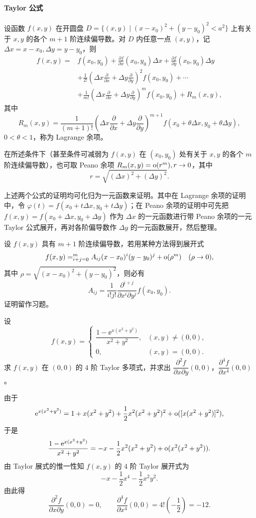 \paragraph{Taylor 公式}
设函数 $f(x,y)$ 在开圆盘 $D=\{(x,y)\mid (x-x_0)^2+(y-y_0)^2<a^2\}$ 上有关于 $x,y$ 的各个 $m+1$ 阶连续偏导数。对 $D$ 内任意一点 $(x,y)$，记 $\Delta x=x-x_0,\Delta y=y-y_0$，则
\[
\begin{aligned}
  f(x,y)={}&f(x_0,y_0)+\frac{\partial f}{\partial x}(x_0,y_0)\Delta x
  +\frac{\partial f}{\partial y}(x_0,y_0)\Delta y\\
  &+\frac1{2!}\left(\Delta x\frac{\partial}{\partial x}+\Delta y\frac{\partial}{\partial y}\right)^2 f(x_0,y_0)+\cdots\\
  &+\frac1{m!}\left(\Delta x\frac{\partial}{\partial x}+\Delta y\frac{\partial}{\partial y}\right)^m f(x_0,y_0)+R_m(x,y),
\end{aligned}
\]
其中
\[
  R_m(x,y)=\frac1{(m+1)!}
  \left(\Delta x\frac{\partial}{\partial x}+\Delta y\frac{\partial}{\partial y}\right)^{m+1}
  f(x_0+\theta\Delta x,y_0+\theta\Delta y),
\]
$0<\theta<1$，称为 Lagrange 余项。

在所述条件下（甚至条件可减弱为 $f(x,y)$ 在 $(x_0,y_0)$ 处有关于 $x,y$ 的各个 $m$ 阶连续偏导数），也可取 Peano 余项 $R_m(x,y)=\mathrm{o}(r^m),r\to0$，其中
\[
  r=\sqrt{(\Delta x)^2+(\Delta y)^2}.
\]

上述两个公式的证明均可化归为一元函数来证明。其中在 Lagrange 余项的证明中，令 $\varphi(t)=f(x_0+t\Delta x,y_0+t\Delta y)$；在 Peano 余项的证明中可先把 $f(x,y)=f(x_0+\Delta x,y_0+\Delta y)$ 作为 $\Delta x$ 的一元函数进行带 Peano 余项的一元 Taylor 公式展开，再对各阶偏导数作 $\Delta y$ 的一元函数展开，然后整理。

\begin{xproposition}
设 $f(x,y)$ 具有 $m+1$ 阶连续偏导数，若用某种方法得到展开式
\[
  f(x,y)=\relax_{i+j=0}^{m}A_{ij}(x-x_0)^i(y-y_0)^j+\mathrm{o}(\rho^m)\quad(\rho\to0),
\]
其中 $\rho=\sqrt{(x-x_0)^2+(y-y_0)^2}$，则必有
\[
  A_{ij}=\frac1{i!j!}\frac{\partial^{i+j}}{\partial x^i\partial y^j}f(x_0,y_0).
\]
证明留作习题。
\end{xproposition}

\begin{xexample}[21.3.1]
设
\[
  f(x,y)=\begin{cases}
    \dfrac{1-\ee^{x(x^2+y^2)}}{x^2+y^2},&(x,y)\ne(0,0),\\[6pt]
    0,&(x,y)=(0,0).
  \end{cases}
\]
求 $f(x,y)$ 在 $(0,0)$ 的 $4$ 阶 Taylor 多项式，并求出 $\dfrac{\partial^2f}{\partial x\partial y}(0,0)$，$\dfrac{\partial^4f}{\partial x^4}(0,0)$。
\end{xexample}
\begin{xsolution}
由于
\[
  \mathrm{e}^{x(x^2+y^2)}=1+x(x^2+y^2)+\frac12x^2(x^2+y^2)^2
  +\mathrm{o}([x(x^2+y^2)]^2),
\]
于是
\[
  \frac{1-\mathrm{e}^{x(x^2+y^2)}}{x^2+y^2}
  =-x-\frac12x^2(x^2+y^2)+\mathrm{o}(x^2(x^2+y^2)).
\]
由 Taylor 展式的惟一性知 $f(x,y)$ 的 $4$ 阶 Taylor 展开式为
\[
  -x-\frac12x^4-\frac12x^2y^2.
\]
由此得
\[
  \frac{\partial^2f}{\partial x\partial y}(0,0)=0,
  \qquad
  \frac{\partial^4f}{\partial x^4}(0,0)=4!\left(-\frac12\right)=-12.
\]
\end{xsolution}

